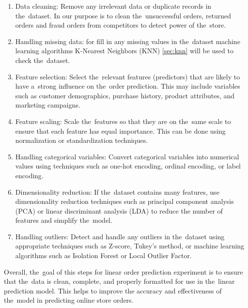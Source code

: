 \begin{enumerate}
    \item Data cleaning: Remove any irrelevant data or duplicate records in the~dataset. In our purpose is to
    clean the~unsuccessful orders, returned orders and fraud orders from competitors to detect power of the~store.
    \item Handling missing data: for fill in any missing values in the~dataset machine learning algorithms
    K-Nearest Neighbors (KNN) \ref{sec:knn} will be used to check the~dataset.
    \item Feature selection: Select the~relevant features (predictors) that are likely to have a~strong
    influence on the~order prediction. This may include variables such as customer demographics, purchase
    history, product attributes, and marketing campaigns.
    \item Feature scaling: Scale the~features so that they are on the~same scale to ensure that each feature
    has equal importance. This can be done using normalization or standardization techniques.
    \item Handling categorical variables: Convert categorical variables into numerical values using techniques
    such as one-hot encoding, ordinal encoding, or label encoding.
    \item Dimensionality reduction: If the~dataset contains many features, use dimensionality reduction techniques
    such as principal component analysis (PCA) or linear discriminant analysis (LDA) to reduce the
    number of features and simplify the~model.
    \item Handling outliers: Detect and handle any outliers in the~dataset using appropriate techniques
    such as Z-score, Tukey’s method, or machine learning algorithms such as Isolation Forest or Local Outlier Factor.
\end{enumerate}
Overall, the~goal of this steps for linear order prediction experiment is to ensure that the~data is clean,
complete, and properly formatted for use in the~linear prediction model. This helps to improve the
accuracy and effectiveness of the~model in predicting online store orders.

